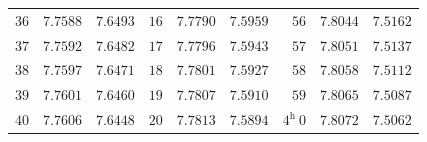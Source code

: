 \begin{center}
{{\begin{minipage}{.83\linewidth}
\begin{tabular}{r|r|r||r|r|r||r|r|r}
$36$ & $7.7588$ & $7.6493$ & $16$ & $7.7790$ & $7.5959$ & $56$ & $7.8044$ & $7.5162$\\
$37$ & $7.7592$ & $7.6482$ & $17$ & $7.7796$ & $7.5943$ & $57$ & $7.8051$ & $7.5137$\\
$38$ & $7.7597$ & $7.6471$ & $18$ & $7.7801$ & $7.5927$ & $58$ & $7.8058$ & $7.5112$\\
$39$ & $7.7601$ & $7.6460$ & $19$ & $7.7807$ & $7.5910$ & $59$ & $7.8065$ & $7.5087$\\
$40$ & $7.7606$ & $7.6448$ & $20$ & $7.7813$ & $7.5894$ & $4^{\mathrm h}\ 0$ & $7.8072$ & $7.5062$\\
\end{tabular}

\endgroup
\end{minipage}}}\endgroup
\end{center}
\clearpage{}%
